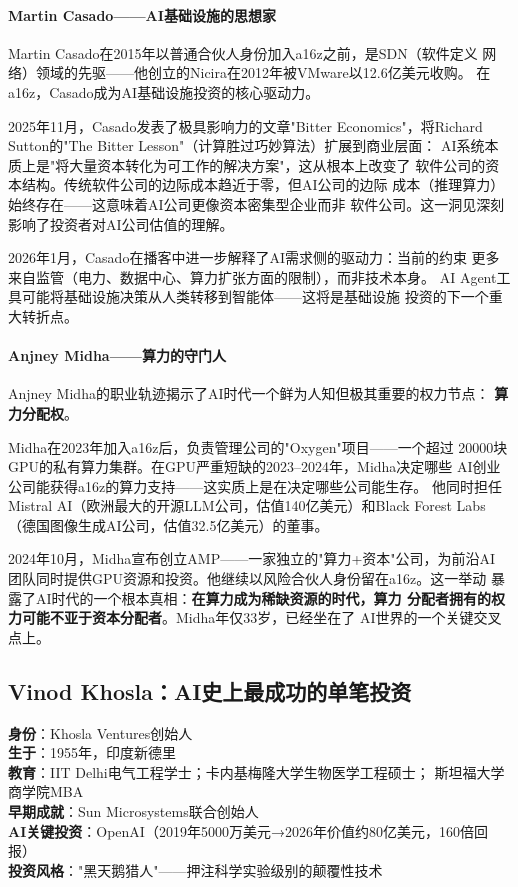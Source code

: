 \paragraph{Martin Casado——AI基础设施的思想家}

Martin Casado在2015年以普通合伙人身份加入a16z之前，是SDN（软件定义
网络）领域的先驱——他创立的Nicira在2012年被VMware以12.6亿美元收购。
在a16z，Casado成为AI基础设施投资的核心驱动力。

2025年11月，Casado发表了极具影响力的文章"Bitter Economics"，将Richard
Sutton的"The Bitter Lesson"（计算胜过巧妙算法）扩展到商业层面：
AI系统本质上是"将大量资本转化为可工作的解决方案"，这从根本上改变了
软件公司的资本结构。传统软件公司的边际成本趋近于零，但AI公司的边际
成本（推理算力）始终存在——这意味着AI公司更像资本密集型企业而非
软件公司。这一洞见深刻影响了投资者对AI公司估值的理解。

2026年1月，Casado在播客中进一步解释了AI需求侧的驱动力：当前的约束
更多来自监管（电力、数据中心、算力扩张方面的限制），而非技术本身。
AI Agent工具可能将基础设施决策从人类转移到智能体——这将是基础设施
投资的下一个重大转折点。

\paragraph{Anjney Midha——算力的守门人}

Anjney Midha的职业轨迹揭示了AI时代一个鲜为人知但极其重要的权力节点：
\textbf{算力分配权}。

Midha在2023年加入a16z后，负责管理公司的"Oxygen"项目——一个超过
20000块GPU的私有算力集群。在GPU严重短缺的2023--2024年，Midha决定哪些
AI创业公司能获得a16z的算力支持——这实质上是在决定哪些公司能生存。
他同时担任Mistral AI（欧洲最大的开源LLM公司，估值140亿美元）和Black
Forest Labs（德国图像生成AI公司，估值32.5亿美元）的董事。

2024年10月，Midha宣布创立AMP——一家独立的"算力+资本"公司，为前沿AI
团队同时提供GPU资源和投资。他继续以风险合伙人身份留在a16z。这一举动
暴露了AI时代的一个根本真相：\textbf{在算力成为稀缺资源的时代，算力
分配者拥有的权力可能不亚于资本分配者}。Midha年仅33岁，已经坐在了
AI世界的一个关键交叉点上。


\subsection{Vinod Khosla：AI史上最成功的单笔投资}
\label{subsec:inv-khosla}

\begin{corebox}
\textbf{身份}：Khosla Ventures创始人 \\
\textbf{生于}：1955年，印度新德里 \\
\textbf{教育}：IIT Delhi电气工程学士；卡内基梅隆大学生物医学工程硕士；
  斯坦福大学商学院MBA \\
\textbf{早期成就}：Sun Microsystems联合创始人 \\
\textbf{AI关键投资}：OpenAI（2019年5000万美元→2026年价值约80亿美元，160倍回报） \\
\textbf{投资风格}："黑天鹅猎人"——押注科学实验级别的颠覆性技术
\end{corebox}

